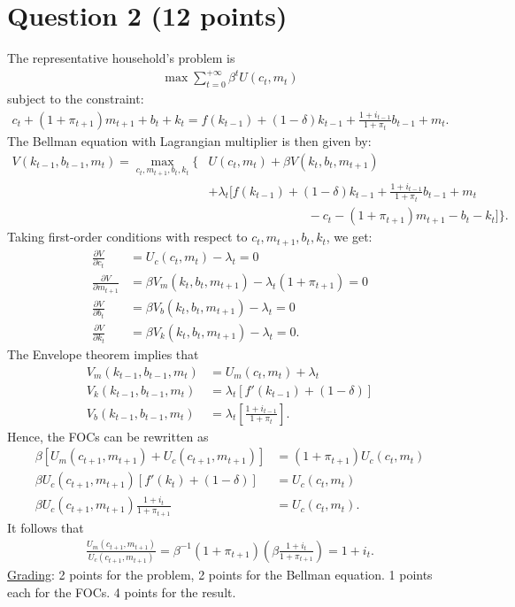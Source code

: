 \documentclass[12pt]{article}
\begin{document}
\section*{Question 2 (12 points)}
The representative household's problem is 
\begin{align*}
    \max \sum_{t=0}^{+\infty} \beta^t U(c_t, m_t)
\end{align*}
subject to the constraint:
\begin{align*}
    c_t + (1+\pi_{t+1}) m _{t+1} + b_t + k_t = f(k_{t-1}) + (1-\delta) k_{t-1} + \frac{1+i_{t-1}}{1+\pi_t} b_{t-1} + m_t.
\end{align*}
The Bellman equation with Lagrangian multiplier is then given by:
\begin{align*}
    V(k_{t-1}, b_{t-1}, m_t) = \max_{c_t, m_{t+1}, b_t, k_t} \Bigg\{ & U(c_t, m_t) + \beta V(k_t, b_t, m_{t+1})\\
    & + \lambda_t \bigg[f(k_{t-1}) + (1-\delta) k_{t-1} + \frac{1+i_{t-1}}{1+\pi_t} b_{t-1} + m_t\\
    & \qquad \qquad \qquad \qquad - c_t - (1+\pi_{t+1}) m_{t+1} - b_t - k_t\bigg] \Bigg\}.
\end{align*}
Taking first-order conditions with respect to $c_t, m_{t+1}, b_t, k_t$, we get:
\begin{align*}
    \frac{\partial V}{\partial c_t} &= U_c(c_t, m_t) - \lambda_t = 0\\
    \frac{\partial V}{\partial m_{t+1}} &= \beta V_m(k_t, b_t, m_{t+1}) - \lambda_t (1+\pi_{t+1}) = 0\\
    \frac{\partial V}{\partial b_t} &= \beta V_b(k_t, b_t, m_{t+1}) - \lambda_t = 0\\
    \frac{\partial V}{\partial k_t} &= \beta V_k(k_t, b_t, m_{t+1}) - \lambda_t = 0.
\end{align*}
The Envelope theorem implies that
\begin{align*}
    V_m(k_{t-1}, b_{t-1}, m_t) &= U_m(c_t, m_t) + \lambda_t\\
    V_k(k_{t-1}, b_{t-1}, m_t) &= \lambda_t\left[f'(k_{t-1}) + (1-\delta)\right]\\
    V_b(k_{t-1}, b_{t-1}, m_t) &= \lambda_t\left[\frac{1+i_{t-1}}{1+\pi_t}\right].
\end{align*}
Hence, the FOCs can be rewritten as
\begin{align*}
    \beta\left[U_m(c_{t+1}, m_{t+1}) + U_c(c_{t+1}, m_{t+1})\right] &= (1+\pi_{t+1})U_c(c_t,m_t)\\
    \beta U_c(c_{t+1}, m_{t+1})\left[f'(k_{t}) + (1-\delta)\right] &= U_c(c_t, m_t)\\
    \beta U_c(c_{t+1}, m_{t+1}) \frac{1+i_t}{1+\pi_{t+1}} &= U_c(c_t, m_t).
\end{align*}
It follows that
\begin{align*}
    \frac{U_m(c_{t+1}, m_{t+1})}{U_c(c_{t+1}, m_{t+1})} = \beta^{-1}(1+\pi_{t+1})\left(\beta \frac{1+i_t}{1+\pi_{t+1}} \right) = 1 + i_t.
\end{align*}
\underline{Grading}: 2 points for the problem, 2 points for the Bellman equation. 1 points each for the FOCs. 4 points for the result.
\end{document}

